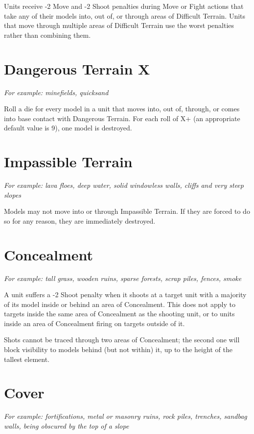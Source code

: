 \begin{multicols}{2}
Units receive -2 Move and -2 Shoot penalties during Move or Fight actions that take any of their models into, out of, or through areas of Difficult Terrain. Units that move through multiple areas of Difficult Terrain use the worst penalties rather than combining them.




\section*{Dangerous Terrain X}
\textit{For example: minefields, quicksand}

Roll a die for every model in a unit that moves into, out of, through, or comes into base contact with Dangerous Terrain. For each roll of X+ (an appropriate default value is 9), one model is destroyed.




\section*{Impassible Terrain}
\textit{For example: lava floes, deep water, solid windowless walls, cliffs and very steep slopes}

Models may not move into or through Impassible Terrain. If they are forced to do so for any reason, they are immediately destroyed.




\section*{Concealment}
\textit{For example: tall grass, wooden ruins, sparse forests, scrap piles, fences, smoke}

A unit suffers a -2 Shoot penalty when it shoots at a target unit with a majority of its model inside or behind an area of Concealment. This does not apply to targets inside the same area of Concealment as the shooting unit, or to units inside an area of Concealment firing on targets outside of it.

Shots cannot be traced through two areas of Concealment; the second one will block visibility to models behind (but not within) it, up to the height of the tallest element.




\section*{Cover}
\textit{For example: fortifications, metal or masonry ruins, rock piles, trenches, sandbag walls, being obscured by the top of a slope}


\end{multicols}
